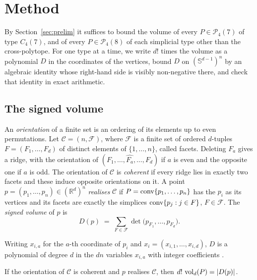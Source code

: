 \section{Method}
\label{sec:method}

By Section~\ref{sec:prelim} it suffices to bound the volume of every
$P \in \mathcal{P}_{4}(7)$ of type $C_{4}(7)$, and of every
$P \in \mathcal{P}_{4}(8)$ of each simplicial type other than the
cross-polytope. For one type at a time, we write $d!$ times the volume
as a polynomial $D$ in the coordinates of the vertices, bound $D$ on
$(\mathbb{S}^{d-1})^{n}$ by an algebraic identity whose right-hand side is
visibly non-negative there, and check that identity in exact arithmetic.

\subsection{The signed volume}

\begin{definition}
  \label{def:signed-volume}
  An \emph{orientation} of a finite set is an ordering of its elements up to
  even permutations. Let $\mathcal{C} = (n, \mathcal{F})$, where
  $\mathcal{F}$ is a finite set of ordered $d$-tuples
  $F = (F_{1}, \ldots, F_{d})$ of distinct elements of $\{1, \ldots, n\}$,
  called facets. Deleting $F_{a}$ gives a ridge,
  with the orientation of $(F_{1}, \ldots, \widehat{F_{a}}, \ldots, F_{d})$
  if $a$ is even and the opposite one if $a$ is odd. The orientation of
  $\mathcal{C}$ is \emph{coherent} if every ridge lies in exactly two facets
  and these induce opposite orientations on it. A point
  $p = (p_{1}, \ldots, p_{n}) \in (\mathbb{R}^{d})^{n}$ \emph{realises}
  $\mathcal{C}$ if $P = \operatorname{conv}\{p_{1}, \ldots, p_{n}\}$ has the $p_{i}$ as its
  vertices and its facets are exactly the simplices
  $\operatorname{conv}\{p_{j} : j \in F\}$, $F \in \mathcal{F}$. The \emph{signed volume} of
  $p$ is
  \begin{equation}
    \label{eq:signed-volume}
    D(p) \;=\; \sum_{F \in \mathcal{F}}
      \det\bigl(p_{F_{1}}, \ldots, p_{F_{d}}\bigr).
  \end{equation}
\end{definition}

Writing $x_{i,a}$ for the $a$-th coordinate of $p_{i}$ and
$x_{i} = (x_{i,1}, \ldots, x_{i,d})$, $D$ is a polynomial of degree $d$ in the
$dn$ variables $x_{i,a}$ with integer coefficients .

\begin{lemma}
  \label{lem:volume}
  If the orientation of $\mathcal{C}$ is coherent and $p$ realises
  $\mathcal{C}$, then $d!\,\operatorname{vol}_{d}(P) = \lvert D(p)\rvert$.
\end{lemma}


